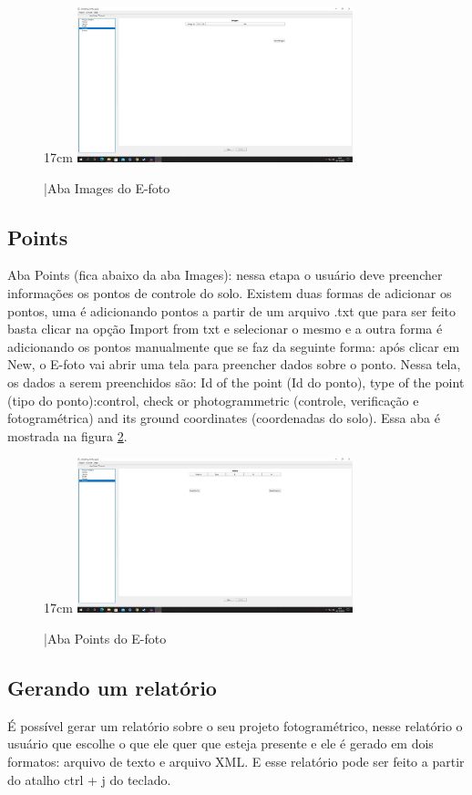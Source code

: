 \begin{figure}[!ht]{17cm}
	\centering
	\includegraphics[width=8cm]{Figuras/image.jpg}
	\caption{|Aba Images do E-foto} \label{fig:image}
\end{figure}

\subsection{Points}
Aba Points (fica abaixo da aba Images): nessa etapa o usuário deve preencher informações os pontos de controle do solo. Existem duas formas de adicionar os pontos, uma é adicionando pontos a partir de um arquivo .txt que para ser feito basta clicar na opção Import from txt e selecionar o mesmo e a outra forma é adicionando os pontos manualmente que se faz da seguinte forma: após clicar em New, o E-foto vai abrir uma tela para preencher dados sobre o ponto. Nessa tela, os dados a serem preenchidos são: Id of the point (Id do ponto), type of the point (tipo do ponto):control, check or photogrammetric (controle, verificação e fotogramétrica) and its ground coordinates (coordenadas do solo). Essa aba é mostrada na figura \ref{fig:points}. 

\begin{figure}[!ht]{17cm}
	\centering
	\includegraphics[width=8cm]{Figuras/points.jpg}
	\caption{|Aba Points do E-foto} \label{fig:points}
\end{figure}

\subsection{Gerando um relatório}
É possível gerar um relatório sobre o seu projeto fotogramétrico, nesse relatório o usuário que escolhe o que ele quer que esteja presente e ele é gerado em dois formatos: arquivo de texto e arquivo XML. E esse relatório pode ser feito a partir do atalho ctrl + j do teclado.

